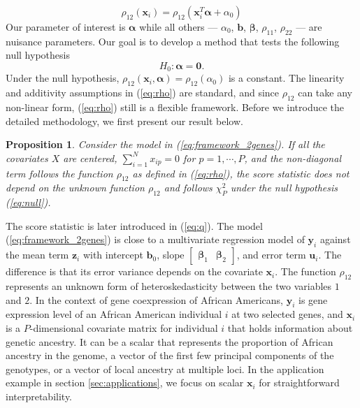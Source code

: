 \documentclass[aap,authoryear, preprint]{imsart}
\numberwithin{equation}{section}
\theoremstyle{plain}
\newtheorem{prop}{Proposition}
\begin{document}
\begin{equation}
    \rho_{12}(\bm{x}_i) = \rho_{12}(\bm{x}_i^T\bm{\alpha} + \alpha_0) \label{eq:rho}
\end{equation}
Our parameter of interest is $\bm{\alpha}$ while all others --- $\alpha_0$, $\bm{b}$, $\bm{\beta}$, $\rho_{11}$, $\rho_{22}$ --- are nuisance parameters. Our goal is to develop a method that tests the following null hypothesis
\begin{equation}
    H_0: \bm{\alpha} = \bm{0}.
    \label{eq:null}
\end{equation}
Under the null hypothesis, $\rho_{12}(\bm{x}_i, \bm{\alpha}) = \rho_{12}(\alpha_0)$ is a constant. The linearity and additivity assumptions in (\ref{eq:rho}) are standard, and since $\rho_{12}$ can take any non-linear form, (\ref{eq:rho}) still is a flexible framework. Before we introduce the detailed methodology, we first present our result below.

\begin{prop}
Consider the model in (\ref{eq:framework_2genes}). If all the covariates $X$ are centered, $\sum_{i=1}^{N} x_{ip} = 0$ for $p = 1, \cdots, P$, and the non-diagonal term follows the function $\rho_{12}$ as defined in (\ref{eq:rho}), the score statistic does not depend on the unknown function $\rho_{12}$ and follows $\chi_P^2$ under the null hypothesis (\ref{eq:null}). 
\label{theorem:q}
\end{prop}

The score statistic is later introduced in (\ref{eq:q}). The model (\ref{eq:framework_2genes}) is close to a multivariate regression model of $\bm{y}_i$ against the mean term $\bm{z}_i$ with intercept $\bm{b}_0$, slope $\begin{bmatrix} \bm{\beta}_1 & \bm{\beta}_2 \end{bmatrix}$, and error term $\bm{u}_i$. The difference is that its error variance depends on the covariate $\bm{x}_i$. The function $\rho_{12}$ represents an unknown form of heteroskedasticity between the two variables $1$ and $2$. In the context of gene coexpression of African Americans, $\bm{y}_i$ is gene expression level of an African American individual $i$ at two selected genes, and $\bm{x}_i$ is a $P$-dimensional covariate matrix for individual $i$ that holds information about genetic ancestry. It can be a scalar that represents the proportion of African ancestry in the genome, a vector of the first few principal components of the genotypes, or a vector of local ancestry at multiple loci. In the application example in section \ref{sec:applications}, we focus on scalar $\bm{x}_i$ for straightforward interpretability. \\
\end{document}
